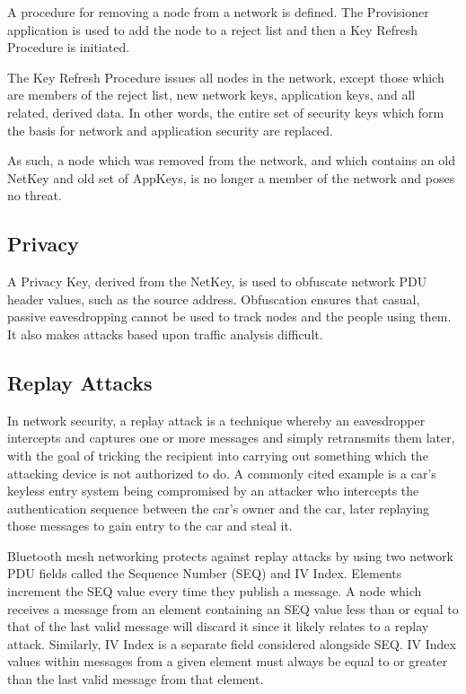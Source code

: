 \documentclass[\main/main.tex]{subfiles}
\begin{document}
A procedure for removing a node from a network is defined. The Provisioner application is used to add the node to a reject list and then a Key Refresh Procedure is initiated.

The Key Refresh Procedure issues all nodes in the network, except those which are members of the reject list, new network keys, application keys, and all related, derived data. In other words, the entire set of security keys which form the basis for network and application security are replaced.

As such, a node which was removed from the network, and which contains an old NetKey and old set of AppKeys, is no longer a member of the network and poses no threat.

\subsection{Privacy}
A Privacy Key, derived from the NetKey, is used to obfuscate network PDU header values, such as the source address. Obfuscation ensures that casual, passive eavesdropping cannot be used to track nodes and the people using them. It also makes attacks based upon traffic analysis difficult.

\subsection{Replay Attacks}
In network security, a replay attack is a technique whereby an eavesdropper intercepts and captures one or more messages and simply retransmits them later, with the goal of tricking the recipient into carrying out something which the attacking device is not authorized to do. A commonly cited example is a car’s keyless entry system being compromised by an attacker who intercepts the authentication sequence between the car’s owner and the car, later replaying those messages to gain entry to the car and steal it.

Bluetooth mesh networking protects against replay attacks by using two network PDU fields called the Sequence Number (SEQ) and IV Index. Elements increment the SEQ value every time they publish a message. A node which receives a message from an element containing an SEQ value less than or equal to that of the last valid message will discard it since it likely relates to a replay attack. Similarly, IV Index is a separate field considered alongside SEQ. IV Index values within messages from a given element must always be equal to or greater than the last valid message from that element.

\bib
\end{document}
